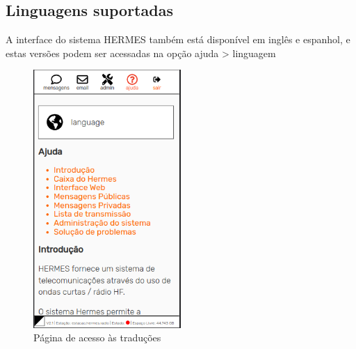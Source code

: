 \documentclass[11pt,a4paper]{article}
\begin{document}
\subsection{Linguagens suportadas}
\label{langs}

A interface do sistema HERMES também está disponível em inglês e espanhol, e estas versões podem ser acessadas na opção ajuda > linguagem


\begin{figure}[H]
    \centering
    \includegraphics[width=0.5\textwidth]{screenshots/frontend/pt_kn/languages.png}
    \caption{Página de acesso às traduções}
	\vspace{-10pt}
    \label{fig:languages}
\end{figure}
\end{document}

